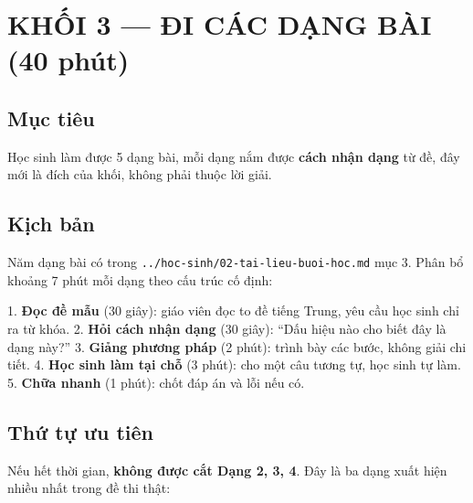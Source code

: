 \documentclass[11pt, a4paper]{article}
\begin{document}
\section{KHỐI 3 — ĐI CÁC DẠNG BÀI (40 phút)}

\subsection{Mục tiêu}

Học sinh làm được 5 dạng bài, mỗi dạng nắm được \textbf{cách nhận dạng} từ đề, đây mới là đích của khối, không phải thuộc lời giải.

\subsection{Kịch bản}

Năm dạng bài có trong \texttt{../hoc-sinh/02-tai-lieu-buoi-hoc.md} mục 3. Phân bổ khoảng 7 phút mỗi dạng theo cấu trúc cố định:

1. \textbf{Đọc đề mẫu} (30 giây): giáo viên đọc to đề tiếng Trung, yêu cầu học sinh chỉ ra từ khóa.
2. \textbf{Hỏi cách nhận dạng} (30 giây): “Dấu hiệu nào cho biết đây là dạng này?”
3. \textbf{Giảng phương pháp} (2 phút): trình bày các bước, không giải chi tiết.
4. \textbf{Học sinh làm tại chỗ} (3 phút): cho một câu tương tự, học sinh tự làm.
5. \textbf{Chữa nhanh} (1 phút): chốt đáp án và lỗi nếu có.

\subsection{Thứ tự ưu tiên}

Nếu hết thời gian, \textbf{không được cắt Dạng 2, 3, 4}. Đây là ba dạng xuất hiện nhiều nhất trong đề thi thật:

\end{document}
